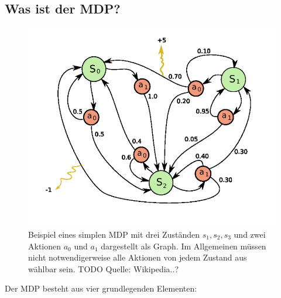 \documentclass[a4paper]{IEEEtran}
\begin{document}
\subsection{Was ist der MDP?}
\begin{figure}[ht]
	\centering
	\includegraphics[scale=0.42]{images/MDP_example.png}
	\caption{Beispiel eines simplen MDP mit drei Zuständen $s_1, s_2, s_3$ und zwei Aktionen $a_0$ und $a_1$ dargestellt als Graph. Im Allgemeinen müssen nicht notwendigerweise alle Aktionen von jedem Zustand aus wählbar sein. TODO Quelle: Wikipedia..?} %
	\label{fig:holoch_MDP_example}
\end{figure}
Der MDP besteht aus vier grundlegenden Elementen:
\end{document}
